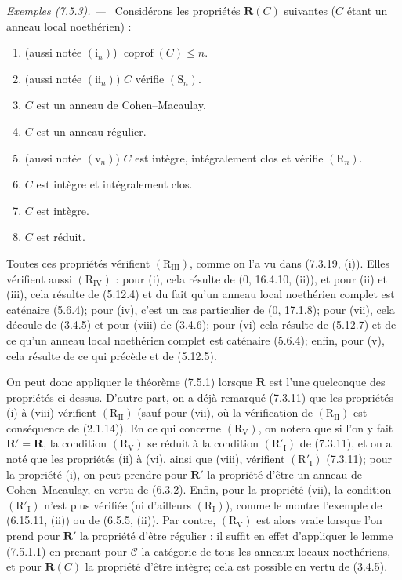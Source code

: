 \documentclass[10pt,oneside]{book}
\newcommand{\oldpage}[2][]{%
  \setcounter{footnote}{0}%
  \marginpar{\scriptsize\textbf{#1}~|~#2}\ignorespaces}
\newenvironment{examples}[1][]{%
  \par\medskip\noindent\textit{Exemples (#1). ---\ }}{\par}
\begin{document}
\begin{examples}[7.5.3]
\label{IV.2.s7.5.3-fr}
Considérons les propriétés $\boldsymbol R(C)$ suivantes ($C$ étant un anneau
local noethérien) :
\begin{enumerate}
\item[\emph{(i)}] (aussi notée $(\mathrm i_n)$) $\operatorname{coprof}(C)\leq n$.
\oldpage[IV-2]{206}
\item[\emph{(ii)}] (aussi notée $(\mathrm{ii}_n)$) $C$ vérifie $(\mathrm S_n)$.
\item[\emph{(iii)}] $C$ est un anneau de Cohen--Macaulay.
\item[\emph{(iv)}] $C$ est un anneau régulier.
\item[\emph{(v)}] (aussi notée $(\mathrm v_n)$) $C$ est intègre, intégralement
clos et vérifie $(\mathrm R_n)$.
\item[\emph{(vi)}] $C$ est intègre et intégralement clos.
\item[\emph{(vii)}] $C$ est intègre.
\item[\emph{(viii)}] $C$ est réduit.
\end{enumerate}
Toutes ces propriétés vérifient $(\mathrm R_{\mathrm{III}})$, comme on l'a vu
dans (7.3.19, (i)). Elles vérifient aussi $(\mathrm R_{\mathrm{IV}})$ : pour
(i), cela résulte de (0, 16.4.10, (ii)), et pour (ii) et (iii), cela résulte de
(5.12.4) et du fait qu'un anneau local noethérien complet est caténaire
(5.6.4); pour (iv), c'est un cas particulier de (0, 17.1.8); pour (vii), cela
découle de (3.4.5) et pour (viii) de (3.4.6); pour (vi) cela résulte de
(5.12.7) et de ce qu'un anneau local noethérien complet est caténaire (5.6.4);
enfin, pour (v), cela résulte de ce qui précède et de (5.12.5).

On peut donc appliquer le théorème (7.5.1) lorsque $\boldsymbol R$ est l'une
quelconque des propriétés ci-dessus. D'autre part, on a déjà remarqué (7.3.11)
que les propriétés (i) à (viii) vérifient $(\mathrm R_{\mathrm{II}})$ (sauf
pour (vii), où la vérification de $(\mathrm R_{\mathrm{II}})$ est conséquence
de (2.1.14)). En ce qui concerne $(\mathrm R_{\mathrm V})$, on notera que si
l'on y fait $\boldsymbol R'=\boldsymbol R$, la condition
$(\mathrm R_{\mathrm V})$ se réduit à la condition
$(\mathrm R'_{\mathrm I})$ de (7.3.11), et on a noté que les propriétés (ii) à
(vi), ainsi que (viii), vérifient $(\mathrm R'_{\mathrm I})$ (7.3.11); pour la
propriété (i), on peut prendre pour $\boldsymbol R'$ la propriété d'être un
anneau de Cohen--Macaulay, en vertu de (6.3.2). Enfin, pour la propriété (vii),
la condition $(\mathrm R'_{\mathrm I})$ n'est plus vérifiée (ni d'ailleurs
$(\mathrm R_{\mathrm I})$), comme le montre l'exemple de (6.15.11, (ii)) ou de
(6.5.5, (ii)). Par contre, $(\mathrm R_{\mathrm V})$ est alors vraie lorsque
l'on prend pour $\boldsymbol R'$ la propriété d'être régulier : il suffit en
effet d'appliquer le lemme (7.5.1.1) en prenant pour $\mathcal C$ la catégorie
de tous les anneaux locaux noethériens, et pour $\boldsymbol R(C)$ la propriété
d'être intègre; cela est possible en vertu de (3.4.5).


\end{examples}
\end{document}
